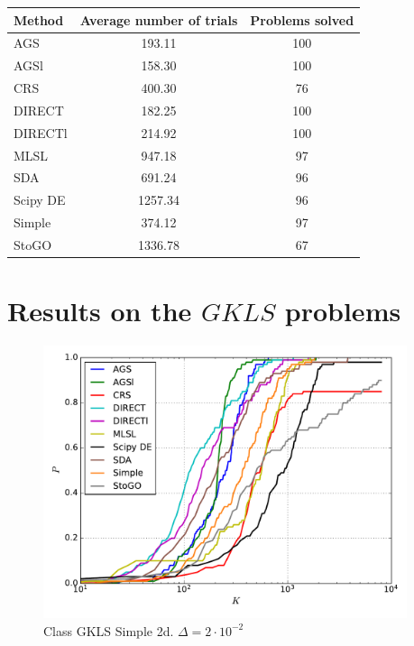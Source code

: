 \documentclass[a4paper]{article}
\begin{document}
\begin{tabular}{lcc}
\hline
 Method   &  Average number of trials  &  Problems solved  \\
\hline
 AGS      &           193.11           &        100        \\
 AGSl     &           158.30           &        100        \\
 CRS      &           400.30           &        76         \\
 DIRECT   &           182.25           &        100        \\
 DIRECTl  &           214.92           &        100        \\
 MLSL     &           947.18           &        97         \\
 SDA      &           691.24           &        96         \\
 Scipy DE &          1257.34           &        96         \\
 Simple   &           374.12           &        97         \\
 StoGO    &          1336.78           &        67         \\
\hline
\end{tabular}
\section{Results on the $GKLS$ problems}

\begin{figure}[H]
  \center
  \includegraphics[width=0.95\textwidth]{../experiments/gklss2d/cmc.pdf}
  \caption{Class GKLS Simple 2d. $\Delta=2\cdot10^{-2}$}
\end{figure}
\end{document}
